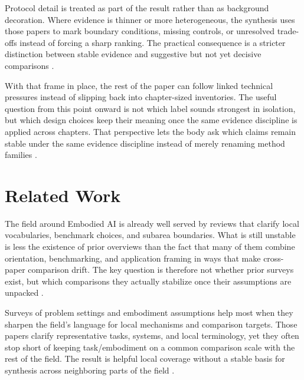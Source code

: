 \documentclass[a4paper,11pt]{article}
\begin{document}
Protocol detail is treated as part of the result rather than as background decoration. Where evidence is thinner or more heterogeneous, the synthesis uses those papers to mark boundary conditions, missing controls, or unresolved trade-offs instead of forcing a sharp ranking. The practical consequence is a stricter distinction between stable evidence and suggestive but not yet decisive comparisons \citep{Hundt2022Robots,Jiang2025Asyncvla,Jlg2025Robot,Kabir2025Socially,Kawaharazuka2025Vision,Kerr2025Robot}.

With that frame in place, the rest of the paper can follow linked technical pressures instead of slipping back into chapter-sized inventories. The useful question from this point onward is not which label sounds strongest in isolation, but which design choices keep their meaning once the same evidence discipline is applied across chapters. That perspective lets the body ask which claims remain stable under the same evidence discipline instead of merely renaming method families \citep{Khan2025Foundation,Kim2024Openvla,Kim2026Robocurate,Kunze2018Artificial,Lee2026Learning,Li2024What}.

\section{Related Work}


The field around Embodied AI is already well served by reviews that clarify local vocabularies, benchmark choices, and subarea boundaries. What is still unstable is less the existence of prior overviews than the fact that many of them combine orientation, benchmarking, and application framing in ways that make cross-paper comparison drift. The key question is therefore not whether prior surveys exist, but which comparisons they actually stabilize once their assumptions are unpacked \citep{Fan2025Interleave,Shao2025Large,Gundawar2025Bench,Kim2026Molmospaces,Din2025Vision,Zheng2024Survey}.

Surveys of problem settings and embodiment assumptions help most when they sharpen the field's language for local mechanisms and comparison targets. Those papers clarify representative tasks, systems, and local terminology, yet they often stop short of keeping task/embodiment on a common comparison scale with the rest of the field. The result is helpful local coverage without a stable basis for synthesis across neighboring parts of the field \citep{Zhu2025Objectvla,Doshi2024Scaling,Bu2025Univla,Bai2025Towards,Zhou2025Autoeval,Dai2026Conla}.
\end{document}
